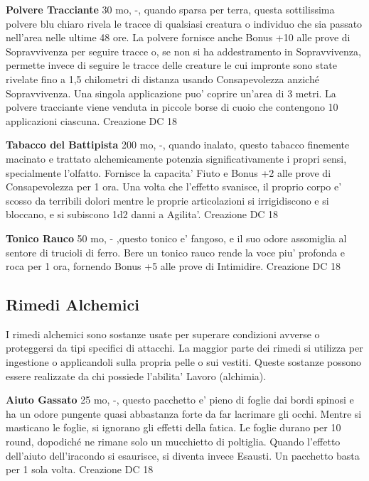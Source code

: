 \documentclass[a4paper,11pt,twoside,openany]{book}
\begin{document}
{		\textbf{Polvere Tracciante} 30 mo, -, quando sparsa per terra, questa sottilissima polvere blu chiaro rivela le tracce di qualsiasi creatura o individuo che sia passato nell'area nelle ultime 48 ore.
		La polvere fornisce anche Bonus +10 alle prove di Sopravvivenza per seguire tracce o, se non si ha addestramento in Sopravvivenza, permette invece di seguire le tracce delle creature le cui impronte sono state rivelate fino a 1,5 chilometri di distanza usando Consapevolezza anziché Sopravvivenza. Una singola applicazione puo' coprire un'area di 3 metri. 
		La polvere tracciante viene venduta in piccole borse di cuoio che contengono 10 applicazioni ciascuna. Creazione DC 18
		
		\textbf{Tabacco del Battipista} 200 mo, -, quando inalato, questo tabacco finemente macinato e trattato alchemicamente potenzia significativamente i propri sensi, specialmente l'olfatto. Fornisce la capacita' Fiuto e Bonus +2 alle prove di Consapevolezza per 1 ora. Una volta che l'effetto svanisce, il proprio corpo e' scosso da terribili dolori mentre le proprie articolazioni si irrigidiscono e si bloccano, e si subiscono 1d2 danni a Agilita'. Creazione DC 18
		
		\textbf{Tonico Rauco} 50 mo, - ,questo tonico e' fangoso, e il suo odore assomiglia al sentore di trucioli di ferro. Bere un tonico rauco rende la voce piu' profonda e roca per 1 ora, fornendo Bonus +5 alle prove di Intimidire. Creazione DC 18
		
		\subsection{Rimedi Alchemici}
		
		\label{rimedi-alchemici}
		
		I rimedi alchemici sono sostanze usate per superare condizioni avverse o proteggersi da tipi specifici di attacchi. La maggior parte dei rimedi si utilizza per ingestione o applicandoli sulla propria pelle o sui vestiti. Queste sostanze possono essere realizzate da chi possiede l'abilita' Lavoro (alchimia).
		
		\textbf{Aiuto Gassato} 25 mo, -, questo pacchetto e' pieno di foglie dai bordi spinosi e ha un odore pungente quasi abbastanza forte da far lacrimare gli occhi. Mentre si masticano le foglie, si ignorano gli effetti della fatica. Le foglie durano per 10 round, dopodiché ne rimane solo un mucchietto di poltiglia.
		Quando l'effetto dell'aiuto dell'iracondo si esaurisce, si diventa invece Esausti. Un pacchetto basta per 1 sola volta. Creazione DC 18
		
}
\end{document}
